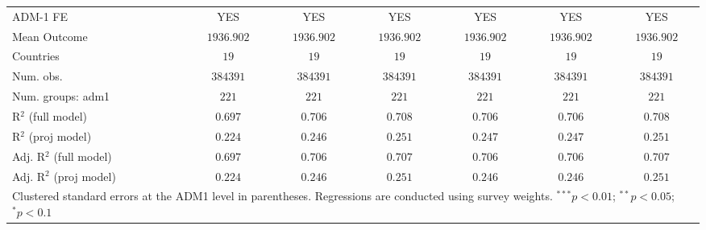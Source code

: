 \begin{table}[htbp]
\begin{center}
\begin{tabular}{l c c c c c c}
ADM-1 FE                & YES           & YES           & YES           & YES           & YES           & YES           \\
Mean Outcome            & $1936.902$    & $1936.902$    & $1936.902$    & $1936.902$    & $1936.902$    & $1936.902$    \\
Countries               & $19$          & $19$          & $19$          & $19$          & $19$          & $19$          \\
Num. obs.               & $384391$      & $384391$      & $384391$      & $384391$      & $384391$      & $384391$      \\
Num. groups: adm1       & $221$         & $221$         & $221$         & $221$         & $221$         & $221$         \\
R$^2$ (full model)      & $0.697$       & $0.706$       & $0.708$       & $0.706$       & $0.706$       & $0.708$       \\
R$^2$ (proj model)      & $0.224$       & $0.246$       & $0.251$       & $0.247$       & $0.247$       & $0.251$       \\
Adj. R$^2$ (full model) & $0.697$       & $0.706$       & $0.707$       & $0.706$       & $0.706$       & $0.707$       \\
Adj. R$^2$ (proj model) & $0.224$       & $0.246$       & $0.251$       & $0.246$       & $0.246$       & $0.251$       \\
\hline
\multicolumn{7}{l}{\scriptsize{Clustered standard errors at the ADM1 level in parentheses. Regressions are conducted using survey weights. $^{***}p<0.01$; $^{**}p<0.05$; $^{*}p<0.1$}}
\end{tabular}
\label{main: tableA12}
\end{center}
\end{table}
